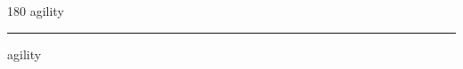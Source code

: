 
\begin{frame}
\begin{center}
\begin{turn}{180}
{\fontsize{2.5cm}{1em}\selectfont agility}
\end{turn}
\vspace{1em}\par  
\hrule
\vspace{1em}\par  
{\fontsize{2.5cm}{1em}\selectfont agility}
\end{center}
\end{frame}
